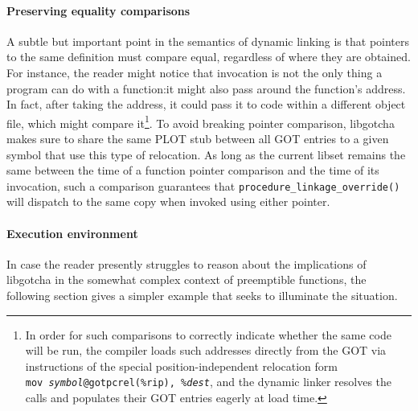 
\paragraph{Preserving equality comparisons}

A subtle but important point in the semantics of dynamic linking is that pointers to
the same definition must compare equal, regardless of where they are obtained.  For
instance,
the reader might notice that invocation is not the only thing a program can do with a
function:\@ it might also pass around the function's address.  In fact, after taking
the address, it could pass it to code within a different object file, which might
compare it\footnote{In order for such comparisons to correctly indicate whether the
same code will be run, the compiler loads such addresses directly from the GOT via
instructions of the special position-independent relocation form
\texttt{mov~\textit{symbol}@gotpcrel(\%rip),~\%\textit{dest}}, and the dynamic linker
resolves the calls and populates their GOT entries eagerly at load time.}.  To avoid
breaking pointer comparison, libgotcha makes sure to share the same PLOT
stub between all GOT entries to a given symbol that use this type of
relocation.  As long as the current libset remains the same between the time of a
function pointer comparison and the time of its invocation, such a comparison
guarantees that \texttt{procedure\_linkage\_override()} will dispatch to the same
copy when invoked using either pointer.




\paragraph{Execution environment}

\vspace{\parsep}
In case the reader presently struggles to reason about the implications of libgotcha
in the somewhat complex context of preemptible functions, the following section gives
a simpler example that seeks to illuminate the situation.

